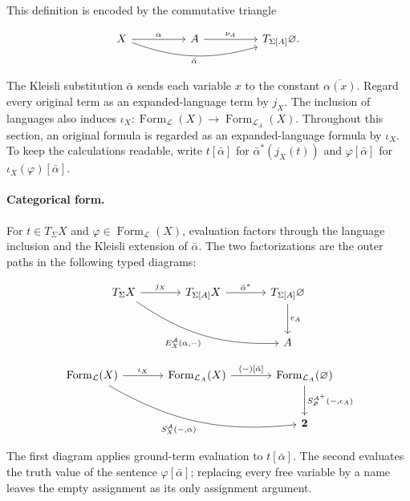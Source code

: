 \documentclass[11pt]{article}
\begin{document}
This definition is encoded by the commutative triangle

\[
\begin{tikzcd}[column sep=huge]
X \arrow[r,"\alpha"]
  \arrow[rr,bend right=18,"\bar\alpha"'] &
A \arrow[r,"\nu_A"] & T_{\Sigma[A]}\varnothing.
\end{tikzcd}
\]

The Kleisli substitution \(\bar\alpha\) sends each variable \(x\) to the
constant \(\overline{\alpha(x)}\). Regard every
original term as an expanded-language term by \(j_X\). The inclusion of
languages also induces
\(\iota_X:\operatorname{Form}_{\mathcal L}(X)\to
\operatorname{Form}_{\mathcal L_A}(X)\). Throughout this section, an original
formula is regarded as an expanded-language formula by \(\iota_X\). To keep the calculations readable,
write \(t[\bar\alpha]\) for \(\bar\alpha^*(j_X(t))\) and
\(\varphi[\bar\alpha]\) for
\(\iota_X(\varphi)[\bar\alpha]\).

\paragraph{Categorical form.}
For \(t\in T_\Sigma X\) and
\(\varphi\in\operatorname{Form}_{\mathcal L}(X)\), evaluation factors through
the language inclusion and the Kleisli extension of \(\bar\alpha\). The two
factorizations are the outer paths in the following typed diagrams:

\[
\begin{tikzcd}[row sep=large,column sep=large]
T_\Sigma X
  \arrow[r,"j_X"]
  \arrow[drr,bend right=18,"{E_X^{\mathcal A}(\alpha,-)}"'] &
T_{\Sigma[A]}X \arrow[r,"\bar\alpha^*"] &
T_{\Sigma[A]}\varnothing \arrow[d,"e_A"] \\
&& A
\end{tikzcd}
\]

\[
\begin{tikzcd}[row sep=large,column sep=large]
\operatorname{Form}_{\mathcal L}(X)
  \arrow[r,"\iota_X"]
  \arrow[drr,bend right=18,"{S_X^{\mathcal A}(-,\alpha)}"'] &
\operatorname{Form}_{\mathcal L_A}(X)
  \arrow[r,"{(-)[\bar\alpha]}"] &
\operatorname{Form}_{\mathcal L_A}(\varnothing)
  \arrow[d,"{S_\varnothing^{\mathcal A^+}(-,\epsilon_A)}"] \\
&& \mathbf 2
\end{tikzcd}
\]

The first diagram applies ground-term evaluation to \(t[\bar\alpha]\). The
second evaluates the truth value of the sentence \(\varphi[\bar\alpha]\);
replacing every free variable by a name leaves the empty assignment as its only
assignment argument.
\end{document}
